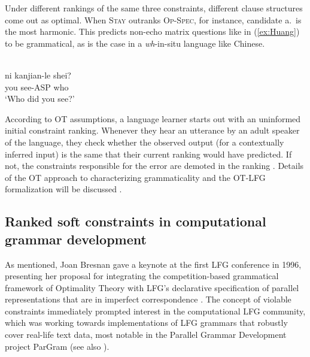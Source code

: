 \documentclass[output=paper,hidelinks]{langscibook}
\begin{document}
Under different rankings of the same three constraints, different clause structures come out as optimal. When \textsc{Stay} outranks \textsc{Op-Spec}, for instance, candidate a.\ is the most harmonic. This predicts non-echo matrix questions like in (\ref{ex:Huang}) to be grammatical, as is the case in a \emph{wh}-in-situ language like Chinese.

\ea\label{ex:Huang}
\\


\gll ni  kanjian-le shei? \\
you see-ASP    who \\
\glt `Who did you see?'
\z

\noindent
According to OT assumptions, a language learner starts out with an uninformed initial constraint ranking. Whenever they hear an utterance by an adult speaker of the language, they check whether the observed output (for a contextually inferred input) is the same that their current ranking would have predicted. If not, the constraints responsible for the error are demoted in the ranking \citep{TesarSmolensky1998}.
Details of the OT approach to characterizing grammaticality and the OT-LFG formalization will be discussed .

\subsection{Ranked soft constraints in computational grammar development}
\label{sec:OT:OT-style-initial-example}

As mentioned, Joan Bresnan gave a keynote at the first LFG conference in 1996, presenting her proposal for integrating the competition-based grammatical framework of Optimality Theory with LFG's declarative specification of parallel representations that are in imperfect correspondence \citep{Bresnan-96-LFG-conference}. The concept of violable constraints immediately prompted interest in the computational LFG community, which was working towards implementations of LFG grammars that robustly cover real-life text data, most notable in the Parallel Grammar Development project ParGram (see also ).
\end{document}
